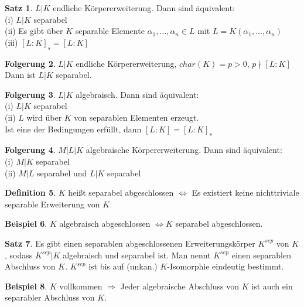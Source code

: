 \documentclass[10pt,a4paper,numbers=endperiod]{scrreprt}
\theoremstyle{definition}
\newtheorem{satz}{Satz}[section]
\newtheorem{defi}[satz]{Definition}
\newtheorem{bsp}[satz]{Beispiel}
\newtheorem{folg}[satz]{Folgerung}
\begin{document}
\begin{satz}
	$L|K$ endliche Körpererweiterung. Dann sind äquivalent:\\
	(i) $L|K$ separabel\\
	(ii) Es gibt über $K$ separable Elemente $\alpha_1, \ldots, \alpha_n \in L$ mit $L = K(\alpha_1, \ldots, \alpha_n)$\\
	(iii) $[L:K]_s = [L:K]$
\end{satz}

\begin{folg}
	$L|K$ endliche Körpererweiterung, $char(K) = p > 0$, $p \nmid [L:K]$\\
	Dann ist $L|K$ separabel.
\end{folg}

\begin{folg}
	$L|K$ algebraisch. Dann sind äquivalent:\\
	(i) $L|K$ separabel\\
	(ii) $L$ wird über $K$ von separablen Elementen erzeugt.\\
	Ist eine der Bedingungen erfüllt, dann $[L:K] = [L:K]_s$
\end{folg}

\begin{folg}
	$M|L|K$ algebraische Körpererweiterung. Dann sind äquivalent:\\
	(i) $M|K$ separabel\\
	(ii) $M|L$ separabel und $L|K$ separabel
\end{folg}

\begin{defi}
	$K$ heißt separabel abgeschlossen $\Leftrightarrow$ Es existiert keine nichttriviale separable Erweiterung von $K$
\end{defi}

\begin{bsp}
	$K$ algebraisch abgeschlossen $\Leftrightarrow K$ separabel abgeschlossen.
\end{bsp}

\begin{satz}
	Es gibt einen separablen abgeschlossenen Erweiterungskörper $K^{sep}$ von $K$, sodass $K^{sep}|K$ algebraisch und separabel ist. Man nennt $K^{sep}$ einen separablen Abschluss von $K$. $K^{sep}$ ist bis auf (unkan.) $K$-Isomorphie eindeutig bestimmt. 
\end{satz}

\begin{bsp}
	$K$ vollkommen $\Rightarrow$ Jeder algebraische Abschluss von $K$ ist auch ein separabler Abschluss von $K$.
\end{bsp}
\end{document}

